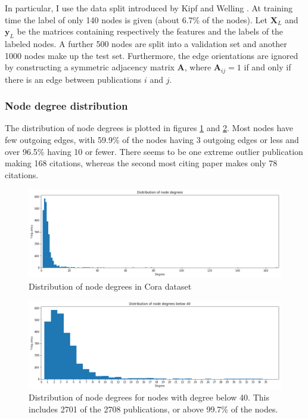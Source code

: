 \documentclass[12pt]{article}
\theoremstyle{definition}
\begin{document}
\bigskip

In particular, I use the data split introduced by Kipf and Welling \cite{kipf2017semi}. At training time the label of only 140 nodes is given (about 6.7\% of the nodes). Let $\mathbf{X}_{L}$ and $\textbf{y}_L$ be the matrices containing respectively the features and the labels of the labeled nodes. A further 500 nodes are split into a validation set and another 1000 nodes make up the test set. Furthermore, the edge orientations are ignored by constructing a symmetric adjacency matrix $\mathbf{A}$, where $\mathbf{A}_{ij} = 1$ if and only if there is an edge between publications $i$ and $j$.

\subsubsection{Node degree distribution}
The distribution of node degrees is plotted in figures \ref{fig/node_degrees} and \ref{fig/node_degrees_truncated}. Most nodes have few outgoing edges, with 59.9\% of the nodes having 3 outgoing edges or less and over 96.5\% having 10 or fewer. There seems to be one extreme outlier publication making 168 citations, whereas the second most citing paper makes only 78 citations.

\begin{figure}[h]
	\includegraphics[width=1.0\textwidth]{node_degrees}
	\centering
	\caption{Distribution of node degrees in Cora dataset}
	\label{fig/node_degrees}
\end{figure}

\begin{figure}[h]
	\includegraphics[width=1.0\textwidth]{node_degrees_truncated}
	\centering
	\caption{Distribution of node degrees for nodes with degree below 40. This includes 2701 of the 2708 publications, or above 99.7\% of the nodes.}
	\label{fig/node_degrees_truncated}
\end{figure}
\end{document}
